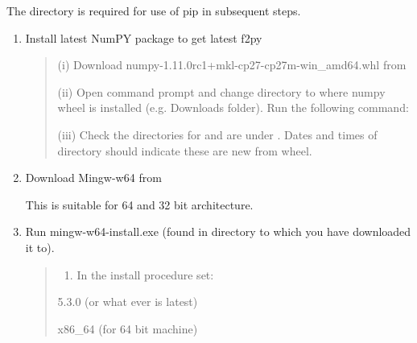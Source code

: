 \documentclass[letterpaper,10pt,english]{sphinxmanual}
\begin{document}
 The  directory is required for use of
pip in subsequent steps.
\begin{enumerate}
\item {} 
Install latest NumPY package to get latest f2py
\begin{quote}

(i) Download numpy-1.11.0rc1+mkl-cp27-cp27m-win\_amd64.whl from

(ii) Open command prompt and change directory to where numpy wheel is
installed (e.g. Downloads folder). Run the following command:

%
\begin{sphinxVerbatim}[commandchars=\\\{\}]
  
\end{sphinxVerbatim}

(iii) Check the directories for  and
 are under
. Dates and times of directory
should indicate these are new from wheel.
\end{quote}

\item {} 
Download Mingw-w64 from

 This is suitable for 64 and 32 bit architecture.

\item {} 
Run mingw-w64-install.exe (found in directory to which you have
downloaded it to).
\begin{quote}
\begin{enumerate}
\item {} 
In the install procedure set:

\end{enumerate}

 5.3.0 (or what ever is latest)

 x86\_64 (for 64 bit machine)


\end{quote}
\end{enumerate}
\end{document}
